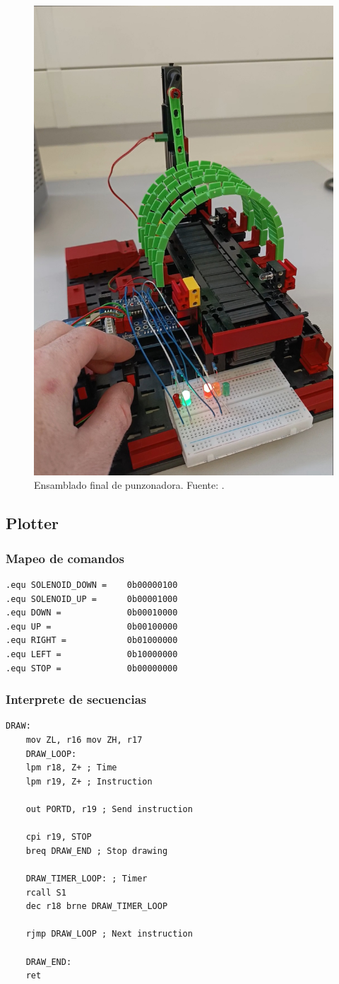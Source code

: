 \begin{figure}[H]
  \centering
  \includegraphics[width=0.7\linewidth]{./Anexos/Resultados/Punzonadora/Circuito.jpg}
  \caption{Ensamblado final de punzonadora. Fuente: \cite{LabDrive}.}
  \label{fig:punzonadora_circuito}
\end{figure}


\subsection{Plotter}

\subsubsection{Mapeo de comandos}
\begin{verbatim}
.equ SOLENOID_DOWN =	0b00000100
.equ SOLENOID_UP =		0b00001000
.equ DOWN =				0b00010000
.equ UP =				0b00100000
.equ RIGHT =			0b01000000
.equ LEFT =				0b10000000
.equ STOP =				0b00000000
\end{verbatim}
\subsubsection{Interprete de secuencias}
\begin{verbatim}
DRAW:
    mov ZL, r16 mov ZH, r17
    DRAW_LOOP:
    lpm r18, Z+ ; Time
    lpm r19, Z+ ; Instruction

    out PORTD, r19 ; Send instruction

    cpi r19, STOP
    breq DRAW_END ; Stop drawing

    DRAW_TIMER_LOOP: ; Timer
    rcall S1
    dec r18 brne DRAW_TIMER_LOOP 

    rjmp DRAW_LOOP ; Next instruction

    DRAW_END:
    ret
\end{verbatim}


